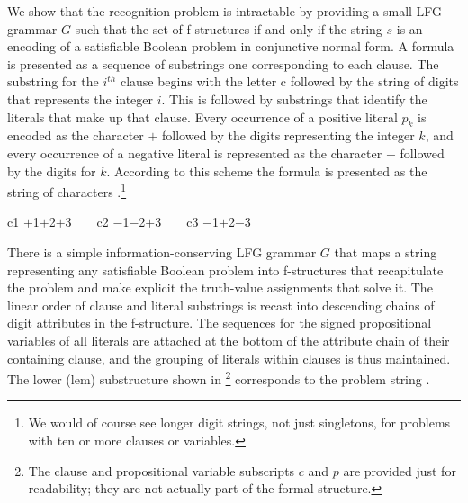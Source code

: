 \documentclass[output=paper,hidelinks]{langscibook}
\begin{document}
We show that the recognition problem is intractable by providing a small LFG grammar $G$ such that the set of f-structures  if and only if the string $s$ is an encoding of a satisfiable Boolean problem in conjunctive normal form. A formula is presented as a sequence of substrings one corresponding to each clause.  The substring for the $i^{th}$ clause begins with the letter c followed by the string of digits  that represents the integer $i$.  This is followed by substrings that identify the literals that make up that clause.  Every occurrence of a positive literal $p_k$ is encoded as the character $+$ followed by the digits representing the integer $k$, and every occurrence of a negative literal  is represented as the character  $-$ followed by the digits for $k$.  According to this scheme the formula  is presented as the string of characters .\footnote{We would of course see longer digit strings, not just singletons, for problems with ten or more clauses or variables.}


\ea\label{recogencoding}
c1 $+$1$+$2$+$3\ \ \ \ c2 $-$1$-$2$+$3\ \ \ \ c3 $-$1$+$2$-$3
\z 

There is a simple information-conserving LFG grammar $G$ that maps a string representing any satisfiable Boolean problem into f-structures that recapitulate the problem and make explicit the truth-value assignments that solve it. The linear order of clause and literal substrings is recast into descending chains of digit attributes in the f-structure. The sequences for the signed propositional variables of all literals are attached at the bottom of the attribute chain of their containing clause, and the grouping of literals within clauses is thus maintained.  The lower (lem) substructure shown in \footnote{The clause and propositional variable subscripts $c$ and $p$ are provided just for readability; they are not actually part of the formal structure.} corresponds to the problem string .
\end{document}
